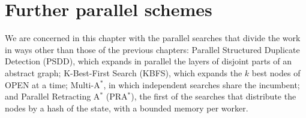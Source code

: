 \chapter{Further parallel schemes}\label{ch:more-parallel-schemes}

\begin{center}
\end{center}

We are concerned in this chapter with the parallel searches that divide the
work in ways other than those of the previous chapters: Parallel Structured
Duplicate Detection (PSDD), which expands in parallel the layers of disjoint
parts of an abstract graph; K-Best-First Search (KBFS), which expands the $k$
best nodes of OPEN at a time; Multi-A$^*$, in which independent searches share
the incumbent; and Parallel Retracting A$^*$ (PRA$^*$), the first of the
searches that distribute the nodes by a hash of the state, with a bounded
memory per worker.


